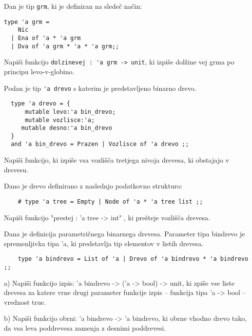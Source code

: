 \begin{ex}
  Dan je tip \lstinline{grm}, ki je definiran na slede\v c na\v cin:

\begin{lstlisting}
type 'a grm = 
    Nic 
  | Ena of 'a * 'a grm 
  | Dva of 'a grm * 'a * 'a grm;;
\end{lstlisting}

  Napi\v si funkcijo \lstinline{dolzinevej : 'a grm -> unit}, ki izpi\v
  se dol\v zine vej grma po principu levo-v-globino.


\end{ex} 
\begin{ex} 
  Podan je tip \lstinline{'a drevo} s katerim je predstavljeno binarno
  drevo.

\begin{lstlisting}
  type 'a drevo = { 
      mutable levo:'a bin_drevo; 
      mutable vozlisce:'a; 
     mutable desno:'a bin_drevo 
  } 
  and 'a bin_drevo = Prazen | Vozlisce of 'a drevo ;;
\end{lstlisting}

  Napi\v si funkcijo, ki izpi\v se vsa vozli\v s\v ca tretjega nivoja
  drevesa, ki obstajajo v drevesu.


\end{ex} 
\begin{ex}
Dano je drevo definirano z naslednjo podatkovno strukturo:

\begin{lstlisting}
	# type 'a tree = Empty | Node of 'a * 'a tree list ;;
\end{lstlisting}
Napi\v si funkcijo "prestej : 'a tree -> int" , ki pre\v steje vozli\v s\v ca drevesa.



\end{ex}
\begin{ex}
Dana je definicija parametri\v cnega binarnega drevesa. Parameter tipa bindrevo je spremenljivka tipa 'a, ki predstavlja tip elementov v listih drevesa.

\begin{lstlisting}
	type 'a bindrevo = List of 'a | Drevo of 'a bindrevo * 'a bindrevo ;;
\end{lstlisting}

a) Napi\v si funkcijo izpis: 'a bindrevo -> ('a -> bool) -> unit, ki zpi\v se vse liste drevesa za katere vrne drugi parameter funkcije izpis -- funkcija tipa 'a -> bool -- vrednost true. 

b) Napi\v si funkcijo obrni: 'a bindrevo -> 'a bindrevo, ki obrne vhodno drevo tako, da vsa leva poddrevesa zamenja z desnimi poddrevesi. 

\end{ex}
